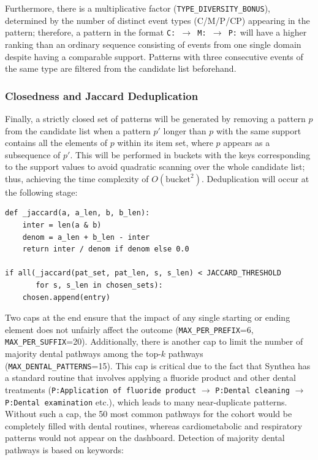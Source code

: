 Furthermore, there is a multiplicative factor (\texttt{TYPE\_DIVERSITY\_BONUS}), determined by the number of distinct event types (C/M/P/CP) appearing in the pattern; therefore, a pattern in the format \texttt{C: \(\rightarrow\) M: \(\rightarrow\) P:} will have a higher ranking than an ordinary sequence consisting of events from one single domain despite having a comparable support. Patterns with three consecutive events of the same type are filtered from the candidate list beforehand.

\subsubsection*{Closedness and Jaccard Deduplication}

Finally, a strictly closed set of patterns will be generated by removing a pattern \(p\) from the candidate list when a pattern \(p'\) longer than \(p\) with the same support contains all the elements of \(p\) within its item set, where \(p\) appears as a subsequence of \(p'\). This will be performed in buckets with the keys corresponding to the support values to avoid quadratic scanning over the whole candidate list; thus, achieving the time complexity of \(O(\text{bucket}^2)\). Deduplication will occur at the following stage:

\begin{lstlisting}[style=pythonstyle]
def _jaccard(a, a_len, b, b_len):
    inter = len(a & b)
    denom = a_len + b_len - inter
    return inter / denom if denom else 0.0

if all(_jaccard(pat_set, pat_len, s, s_len) < JACCARD_THRESHOLD
       for s, s_len in chosen_sets):
    chosen.append(entry)

\end{lstlisting}

Two caps at the end ensure that the impact of any single starting or ending element does not unfairly affect the outcome (\texttt{MAX\_PER\_PREFIX}=6, \texttt{MAX\_PER\_SUFFIX}=20). Additionally, there is another cap to limit the number of majority dental pathways among the top-\(k\) pathways (\texttt{MAX\_DENTAL\_PATTERNS}=15). This cap is critical due to the fact that Synthea has a standard routine that involves applying a fluoride product and other dental treatments (\texttt{P:Application of fluoride product} \(\rightarrow\) \texttt{P:Dental cleaning} \(\rightarrow\) \texttt{P:Dental examination} etc.), which leads to many near-duplicate patterns. Without such a cap, the 50 most common pathways for the cohort would be completely filled with dental routines, whereas cardiometabolic and respiratory patterns would not appear on the dashboard. Detection of majority dental pathways is based on keywords:

